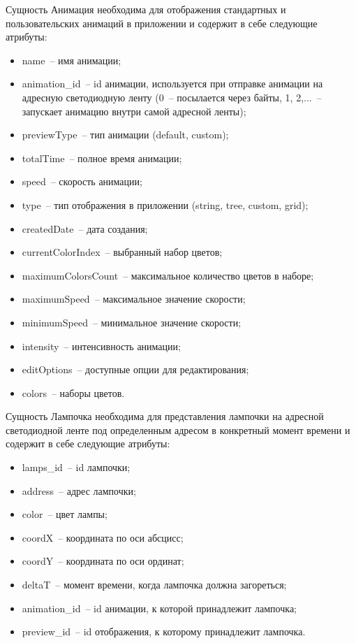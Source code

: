 Сущность Анимация необходима для отображения стандартных и пользовательских анимаций в приложении и содержит в себе следующие атрибуты:
\begin{itemize}
	\item name~-- имя анимации;
	\item animation\_id~-- id анимации, используется при отправке анимации на адресную светодиодную ленту (0~-- посылается через байты, 1, 2,...~-- запускает анимацию внутри самой адресной ленты);
	\item previewType~-- тип анимации (default, custom);
	\item totalTime~-- полное время анимации;
	\item speed~-- скорость анимации;
	\item type~-- тип отображения в приложении (string, tree, custom, grid);
	\item createdDate~-- дата создания;
	\item currentColorIndex~-- выбранный набор цветов;
	\item maximumColorsCount~-- максимальное количество цветов в наборе;
	\item maximumSpeed~-- максимальное значение скорости;
	\item minimumSpeed~-- минимальное значение скорости;
	\item intensity~-- интенсивность анимации;
	\item editOptions~-- доступные опции для редактирования;
	\item colors~-- наборы цветов.
\end{itemize}

Сущность Лампочка необходима для представления лампочки на адресной светодиодной ленте под определенным адресом в конкретный момент времени и содержит в себе следующие атрибуты:
\begin{itemize}
	\item lamps\_id~-- id лампочки;
	\item address~-- адрес лампочки;
	\item color~-- цвет лампы;
	\item coordX~-- координата по оси абсцисс;
	\item coordY~-- координата по оси ординат;
	\item deltaT~-- момент времени, когда лампочка должна загореться;
	\item animation\_id~-- id анимации, к которой принадлежит лампочка;
	\item preview\_id~-- id отображения, к которому принадлежит лампочка.
\end{itemize}

